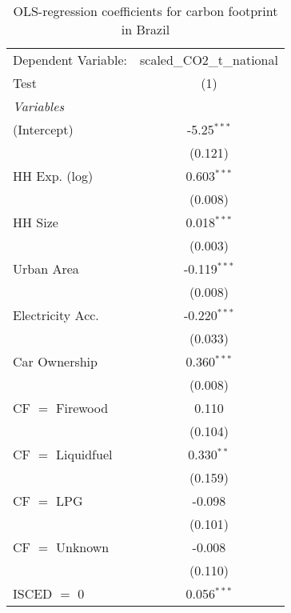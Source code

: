 
\begin{table}[htbp!]
   \centering
   \small
   \begin{adjustbox}{width = 1\textwidth, max height = 0.95\textheight, center}
      \begin{threeparttable}[b]
         \caption{\label{tab:OLS_2_BRA} OLS-regression coefficients for carbon footprint in Brazil}
         \begin{tabular}{lc}
            \tabularnewline \midrule \midrule
            Dependent Variable: & scaled\_CO2\_t\_national\\     
            Test                & (1)\\  
            \midrule
            \emph{Variables}\\
            (Intercept)         & -5.25$^{***}$\\   
                                & (0.121)\\   
            HH Exp. (log)       & 0.603$^{***}$\\   
                                & (0.008)\\   
            HH Size             & 0.018$^{***}$\\   
                                & (0.003)\\   
            Urban Area          & -0.119$^{***}$\\   
                                & (0.008)\\   
            Electricity Acc.    & -0.220$^{***}$\\   
                                & (0.033)\\   
            Car Ownership       & 0.360$^{***}$\\   
                                & (0.008)\\   
            CF $=$ Firewood     & 0.110\\   
                                & (0.104)\\   
            CF $=$ Liquidfuel   & 0.330$^{**}$\\   
                                & (0.159)\\   
            CF $=$ LPG          & -0.098\\   
                                & (0.101)\\   
            CF $=$ Unknown      & -0.008\\   
                                & (0.110)\\   
            ISCED $=$ 0         & 0.056$^{***}$\\   

\end{tabular}
\end{threeparttable}
\end{adjustbox}
\end{table}
